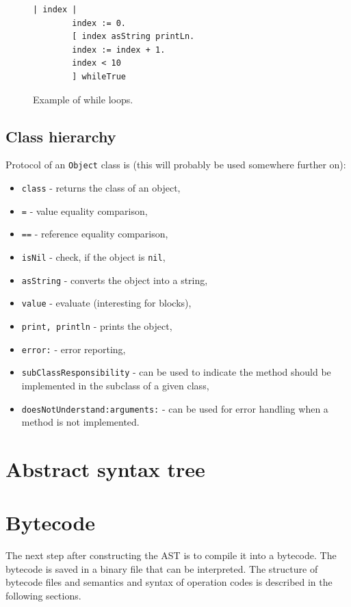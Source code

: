 \documentclass[thesis=M,english]{FITthesis}[2019/12/23]
\begin{document}
\begin{figure}[h!]
	\begin{lstlisting}[language=Smalltalk]
		| index |
		index := 0.
		[ index asString printLn.
		index := index + 1.
		index < 10
		] whileTrue
	\end{lstlisting}
	\caption{Example of while loops.}
	\label{lst-while}
\end{figure}

\subsection{Class hierarchy}
Protocol of an \texttt{Object} class is (this will probably be used somewhere further on):
\begin{itemize}
	\item \texttt{class} - returns the class of an object,
	\item \texttt{=} - value equality comparison,
	\item \texttt{==} - reference equality comparison,
	\item \texttt{isNil} - check, if the object is \texttt{nil},
	\item \texttt{asString} - converts the object into a string,
	\item \texttt{value} - evaluate (interesting for blocks),
	\item \texttt{print, println} - prints the object,
	\item \texttt{error:} - error reporting,
	\item \texttt{subClassResponsibility} - can be used to indicate the method should be
		implemented in the subclass of a given class,
	\item \texttt{doesNotUnderstand:arguments:} - can be used for error handling when a method is not implemented.
\end{itemize}

\section{Abstract syntax tree}

\section{Bytecode}
The next step after constructing the AST is to compile it into a bytecode. The bytecode is saved in a binary file that can be
interpreted. The structure of bytecode files and semantics and syntax of operation codes is described in the following sections.
\end{document}
